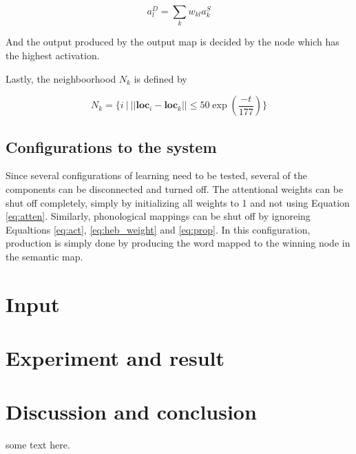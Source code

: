 \documentclass[a4paper,11pt]{article}
\begin{document}
\begin{equation}\label{eq:prop}
a_l^D = \sum_k w_{kl}a_k^S
\end{equation}

And the output produced by the output map is decided by the node which has the
highest activation.

Lastly, the neighboorhood $N_k$ is defined by

\begin{equation}\label{eq:neighboors}
N_k = \{ i \:| \:|| \textbf{loc$_i$} - \textbf{loc$_k$} || \leq 50\exp(\frac
{-t}{177})\}
\end{equation}

\subsection{Configurations to the system}

Since several configurations of learning need to be tested, several of the
components can be disconnected and turned off.  The attentional weights can be
shut off completely, simply by initializing all weights to 1 and not using
Equation \ref{eq:atten}.  Similarly, phonological mappings can be shut off by
ignoreing Equaltions \ref{eq:act}, \ref{eq:heb_weight} and \ref{eq:prop}.  In
this configuration, production is simply done by producing the word mapped to
the winning node in the semantic map.

\section{Input}
\section{Experiment and result}
\section{Discussion and conclusion}
some text here.   
\end{document}
